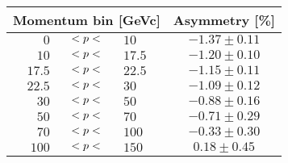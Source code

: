 \begin{tabular}{rclc}
  \toprule
  \multicolumn{3}{c}{Momentum bin [\si{GeVc}]} & Asymmetry  [\si{\percent}] \\
  \midrule
  $0    $ & $< p <$ & $10$   & $-1.37 \pm 0.11$ \\
  $10   $ & $< p <$ & $17.5$ & $-1.20 \pm 0.10$   \\
  $17.5 $ & $< p <$ & $22.5$ & $-1.15 \pm 0.11$ \\
  $22.5 $ & $< p <$ & $30$   & $-1.09 \pm 0.12$ \\
  $30   $ & $< p <$ & $50$   & $-0.88 \pm 0.16$ \\
  $50   $ & $< p <$ & $70$   & $-0.71 \pm 0.29$ \\
  $70   $ & $< p <$ & $100$  & $-0.33 \pm 0.30$  \\
  $100  $ & $< p <$ & $150$  & $0.18 \pm 0.45$  \\
  \bottomrule
\end{tabular}
